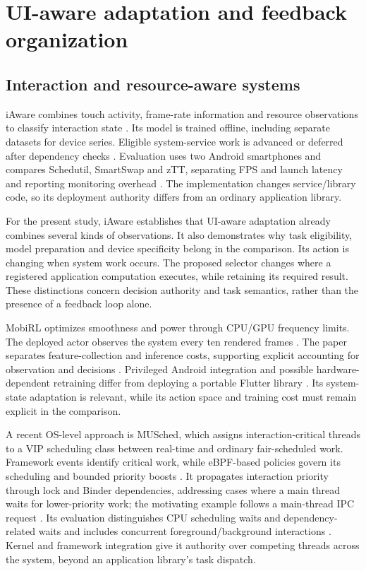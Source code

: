 \documentclass[14pt,a4paper,oneside]{extreport}
\begin{document}
\section{UI-aware adaptation and feedback organization}
\label{ui-aware-adaptation-and-feedback-organization}

\subsection{Interaction and resource-aware systems}
\label{interaction-and-resource-aware-systems}

iAware combines touch activity, frame-rate information and resource observations to classify
interaction state \citep[Secs. 3.1--3.2]{iaware2023}. Its model is trained offline, including
separate datasets for device series. Eligible system-service work is advanced or deferred
after dependency checks \citep[Secs. 3.3--3.4]{iaware2023}. Evaluation uses two Android
smartphones and compares Schedutil, SmartSwap and zTT, separating FPS and launch latency and
reporting monitoring overhead \citep[Secs. 4, 5.1, 5.4]{iaware2023}. The implementation
changes service/library code, so its deployment authority differs from an ordinary application
library.

For the present study, iAware establishes that UI-aware adaptation already combines several
kinds of observations. It also demonstrates why task eligibility, model preparation and device
specificity belong in the comparison. Its action is changing when system work occurs. The
proposed selector changes where a registered application computation executes, while retaining
its required result. These distinctions concern decision authority and task semantics, rather
than the presence of a feedback loop alone.

MobiRL optimizes smoothness and power through CPU/GPU frequency limits. The deployed actor
observes the system every ten rendered frames \citep[Secs. 4.3--4.4, 5.4.6]{dou2025}. The
paper separates feature-collection and inference costs, supporting explicit accounting for
observation and decisions \citep[Sec. 5.8]{dou2025}. Privileged Android integration and
possible hardware-dependent retraining differ from deploying a portable Flutter library
\citep[Sec. 6]{dou2025}. Its system-state adaptation is relevant, while its action space and
training cost must remain explicit in the comparison.

A recent OS-level approach is MUSched, which assigns interaction-critical threads to a VIP
scheduling class between real-time and ordinary fair-scheduled work. Framework events
identify critical work, while eBPF-based policies govern its scheduling and bounded priority
boosts \citep[Secs. 4--5]{musched2026}. It propagates interaction priority through lock
and Binder dependencies, addressing cases where a main thread waits for lower-priority
work; the motivating example follows a main-thread IPC request
\citep[Fig.~1]{musched2026}. Its evaluation distinguishes CPU scheduling waits and
dependency-related waits and includes concurrent foreground/background interactions
\citep[Sec. 6, Table~3]{musched2026}. Kernel and framework integration give it authority
over competing threads across the system, beyond an application library's task dispatch.
\end{document}
